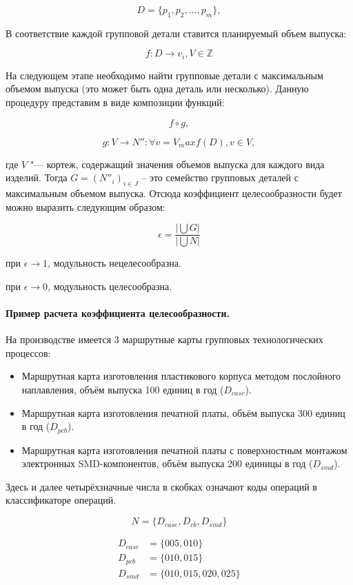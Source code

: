\[
D = \{p_1, p_2, \ldots, p_m\},
\]

\noindent В соответствие каждой групповой детали ставится планируемый объем выпуска:

\[
f: D \rightarrow v_i, V \in \mathbb{Z}
\]

На следующем этапе необходимо найти групповые детали с максимальным объемом выпуска (это может быть одна деталь или несколько). Данную процедуру представим в виде композиции функций:

\[
f \circ g,
\]

\[
g: V \rightarrow N'': \forall v = V_max f(D), v \in V,
\]

\noindent где $V$ "--- кортеж, содержащий значения объемов выпуска для каждого вида изделий. Тогда $G=({N''}_i)_{i \in J}$ -- это семейство групповых деталей с максимальным объемом выпуска.
Отсюда коэффициент целесообразности будет можно выразить следующим образом:

\[
\epsilon = \frac{\big|\bigcup G \big|}{\big|\bigcup N \big|}
\]

\noindent при $\epsilon \rightarrow 1$, модульность нецелесообразна.

\noindent при $\epsilon \rightarrow 0$, модульность целесообразна.

\paragraph{Пример расчета коэффициента целесообразности.}

На производстве имеется 3 маршрутные карты групповых технологических процессов:

\begin{itemize}
	\item Маршрутная карта изготовления пластикового корпуса методом послойного наплавления, объём выпуска 100 единиц в год ($D_{case}$).
	\item Маршрутная карта изготовления печатной платы, объём выпуска 300 единиц в год ($D_{pcb}$).
	\item Маршрутная карта изготовления печатной платы с поверхностным монтажом электронных SMD-компонентов, объём выпуска 200 единицы в год ($D_{smd}$).
\end{itemize}

Здесь и далее четырёхзначные числа в скобках означают коды операций в классификаторе операций.

\[
N = \{D_{case}, D_{cb}, D_{smd}\}
\]

\begin{equation}
\begin{split}
	D_{case} &= \{005, 010\} \\
	D_{pcb} &= \{010, 015\} \\
	D_{smd} &= \{010, 015, 020, 025\}
\end{split}
\end{equation}

